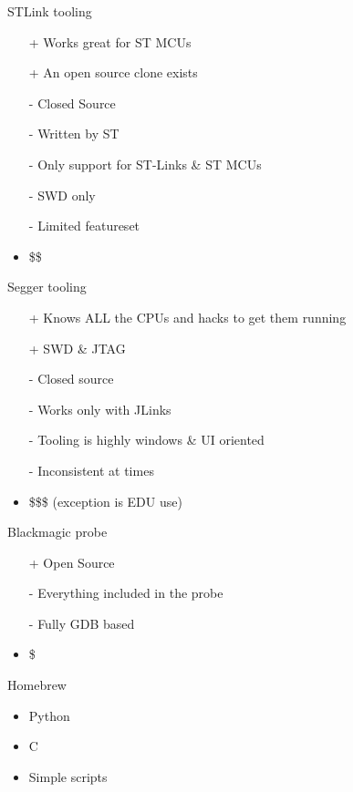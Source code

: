 \documentclass[aspectratio=1610,14pt,t]{beamer}
\begin{document}
\begin{frame}[c]{STLink tooling}
  \begin{itemize}
    \item[+] Works great for ST MCUs
    \item[+] An open source clone exists 
    \item[-] Closed Source
    \item[-] Written by ST
    \item[-] Only support for ST-Links \& ST MCUs
    \item[-] SWD only
    \item[-] Limited featureset
    \item \$\$ 
  \end{itemize}
\end{frame}

\begin{frame}[c]{Segger tooling}
  \begin{itemize}
    \item[+] Knows ALL the CPUs and hacks to get them running
    \item[+] SWD \& JTAG 
    \item[-] Closed source
    \item[-] Works only with JLinks 
    \item[-] Tooling is highly windows \& UI oriented
    \item[-] Inconsistent at times 
    \item \$\$\$ (exception is EDU use)
  \end{itemize}
\end{frame}

\begin{frame}[c]{Blackmagic probe}
  \begin{itemize}
    \item[+] Open Source 
    \item[-] Everything included in the probe
    \item[-] Fully GDB based
    \item \$
  \end{itemize}
\end{frame}

\begin{frame}[c]{Homebrew}
  \begin{itemize}
    \item Python
    \item C
    \item Simple scripts
  \end{itemize}
\end{frame}
\end{document}
